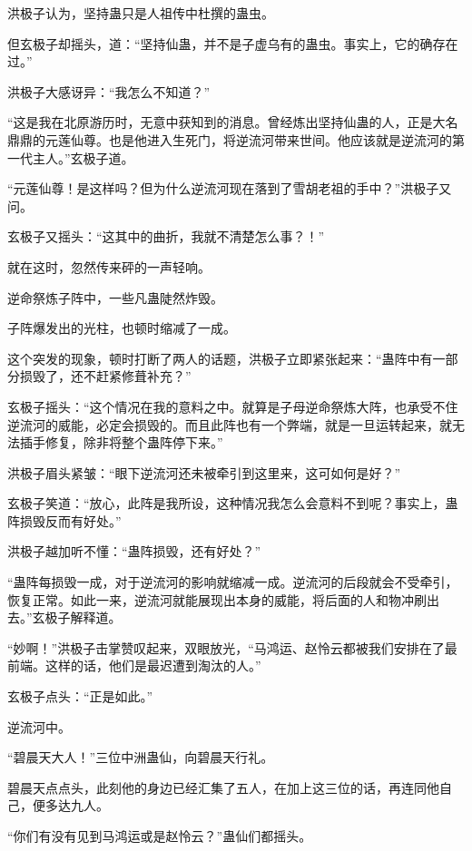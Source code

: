
\begin{this_body}



洪极子认为，坚持蛊只是人祖传中杜撰的蛊虫。

但玄极子却摇头，道：“坚持仙蛊，并不是子虚乌有的蛊虫。事实上，它的确存在过。”

洪极子大感讶异：“我怎么不知道？”

“这是我在北原游历时，无意中获知到的消息。曾经炼出坚持仙蛊的人，正是大名鼎鼎的元莲仙尊。也是他进入生死门，将逆流河带来世间。他应该就是逆流河的第一代主人。”玄极子道。

“元莲仙尊！是这样吗？但为什么逆流河现在落到了雪胡老祖的手中？”洪极子又问。

玄极子又摇头：“这其中的曲折，我就不清楚怎么事？！”

就在这时，忽然传来砰的一声轻响。

逆命祭炼子阵中，一些凡蛊陡然炸毁。

子阵爆发出的光柱，也顿时缩减了一成。

这个突发的现象，顿时打断了两人的话题，洪极子立即紧张起来：“蛊阵中有一部分损毁了，还不赶紧修葺补充？”

玄极子摇头：“这个情况在我的意料之中。就算是子母逆命祭炼大阵，也承受不住逆流河的威能，必定会损毁的。而且此阵也有一个弊端，就是一旦运转起来，就无法插手修复，除非将整个蛊阵停下来。”

洪极子眉头紧皱：“眼下逆流河还未被牵引到这里来，这可如何是好？”

玄极子笑道：“放心，此阵是我所设，这种情况我怎么会意料不到呢？事实上，蛊阵损毁反而有好处。”

洪极子越加听不懂：“蛊阵损毁，还有好处？”

“蛊阵每损毁一成，对于逆流河的影响就缩减一成。逆流河的后段就会不受牵引，恢复正常。如此一来，逆流河就能展现出本身的威能，将后面的人和物冲刷出去。”玄极子解释道。

“妙啊！”洪极子击掌赞叹起来，双眼放光，“马鸿运、赵怜云都被我们安排在了最前端。这样的话，他们是最迟遭到淘汰的人。”

玄极子点头：“正是如此。”

逆流河中。

“碧晨天大人！”三位中洲蛊仙，向碧晨天行礼。

碧晨天点点头，此刻他的身边已经汇集了五人，在加上这三位的话，再连同他自己，便多达九人。

“你们有没有见到马鸿运或是赵怜云？”蛊仙们都摇头。


\end{this_body}
